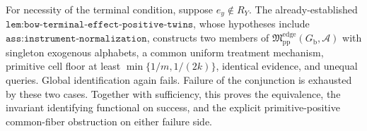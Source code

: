 For necessity of the terminal condition, suppose \(e_y\notin R_Y\).  The already-established \(\texttt{lem:bow-terminal-effect-positive-twins}\), whose hypotheses include \(\texttt{ass:instrument-normalization}\), constructs two members of \(\mathfrak M_{\mathrm{pp}}^{\mathrm{edge}}(G_{\mathrm b},\mathcal A)\) with singleton exogenous alphabets, a common uniform treatment mechanism, primitive cell floor at least \(\min\{1/m,1/(2k)\}\), identical evidence, and unequal queries.  Global identification again fails.  Failure of the conjunction is exhausted by these two cases.  Together with sufficiency, this proves the equivalence, the invariant identifying functional on success, and the explicit primitive-positive common-fiber obstruction on either failure side.